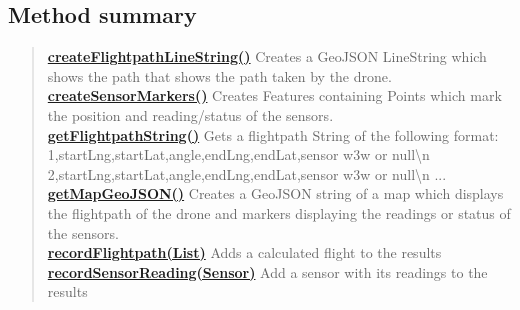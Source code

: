 \documentclass[11pt,a4paper]{report}
\begin{document}
{{{{{{\subsection{Method summary}{
\begin{verse}
\hyperlink{uk.ac.ed.inf.aqmaps.Results.createFlightpathLineString()}{{\bf createFlightpathLineString()}} Creates a GeoJSON LineString which shows the path that shows the path taken by the drone.\\
\hyperlink{uk.ac.ed.inf.aqmaps.Results.createSensorMarkers()}{{\bf createSensorMarkers()}} Creates Features containing Points which mark the position and reading/status of the sensors.\\
\hyperlink{uk.ac.ed.inf.aqmaps.Results.getFlightpathString()}{{\bf getFlightpathString()}} Gets a flightpath String of the following format: 1,\lbrack startLng\rbrack ,\lbrack startLat\rbrack ,\lbrack angle\rbrack ,\lbrack endLng\rbrack ,\lbrack endLat\rbrack ,\lbrack sensor w3w or null\rbrack \textbackslash n 2,\lbrack startLng\rbrack ,\lbrack startLat\rbrack ,\lbrack angle\rbrack ,\lbrack endLng\rbrack ,\lbrack endLat\rbrack ,\lbrack sensor w3w or null\rbrack \textbackslash n ...\\
\hyperlink{uk.ac.ed.inf.aqmaps.Results.getMapGeoJSON()}{{\bf getMapGeoJSON()}} Creates a GeoJSON string of a map which displays the flightpath of the drone and markers displaying the readings or status of the sensors.\\
\hyperlink{uk.ac.ed.inf.aqmaps.Results.recordFlightpath(java.util.List)}{{\bf recordFlightpath(List)}} Adds a calculated flight to the results\\
\hyperlink{uk.ac.ed.inf.aqmaps.Results.recordSensorReading(uk.ac.ed.inf.aqmaps.Sensor)}{{\bf recordSensorReading(Sensor)}} Add a sensor with its readings to the results\\
\end{verse}
}
}}}}}}
\end{document}

